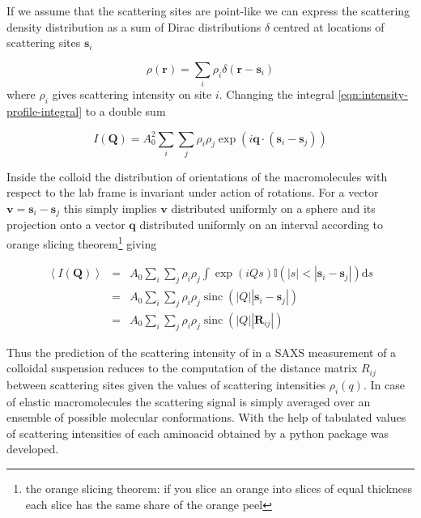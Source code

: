 \documentclass{doctoral}
\newcommand{\dd}{\mathrm{d}}
\newcommand{\code}[1]{\texttt{\detokenize{#1}}}
\begin{document}
If we assume that the scattering sites are point-like we can express the scattering density distribution as a sum of Dirac distributions $\delta$ centred at locations of scattering sites $\mathbf{s}_i$ 

\begin{equation}
    \rho(\mathbf{r}) = \sum_i \rho_i \delta(\mathbf{r}-\mathbf{s}_i)
\end{equation}
where $\rho_i$ gives scattering intensity on site $i$.
Changing the integral \eqref{eqn:intensity-profile-integral} to a double sum 

\begin{equation}
    I(\mathbf{Q}) = A_0^2 \sum_i \sum_j \rho_i \rho_j \exp(i \mathbf{q} \cdot (\mathbf{s}_i - \mathbf{s}_j))
\end{equation}

Inside the colloid the distribution of orientations of the macromolecules with respect to the lab frame is invariant under action of rotations.
For a vector $\mathbf{v} = \mathbf{s}_i - \mathbf{s}_j$ this simply implies $\mathbf{v}$ distributed uniformly on a sphere and its projection onto a vector $\mathbf{q}$ distributed uniformly on an interval according to orange slicing theorem\footnote{the orange slicing theorem: if you slice an orange into slices of equal thickness each slice has the same share of the orange peel} giving 

\begin{eqnarray}
    \left< I(\mathbf{Q}) \right> & = & A_0 \sum_i \sum_j \rho_i \rho_j \int \exp(i Q s) \mathbb{I}(|s| < |\mathbf{s}_i - \mathbf{s}_j|) \dd s \\
                                 & = & A_0 \sum_i \sum_j \rho_i \rho_j \operatorname{sinc}(|Q||\mathbf{s}_i - \mathbf{s}_j|)                  \\
                                 & = & A_0 \sum_i \sum_j \rho_i \rho_j \operatorname{sinc}(|Q||\mathbf{R}_{ij}|)
\end{eqnarray}

Thus the prediction of the scattering intensity of in a SAXS measurement of a colloidal suspension reduces to the computation of the distance matrix $R_{ij}$ between scattering sites given the values of scattering intensities $\rho_i(q)$.
In case of elastic macromolecules the scattering signal is simply averaged over an ensemble of possible molecular conformations.
With the help of tabulated values of scattering intensities of each aminoacid obtained by \textcite{Tong_2016} a python package \code{saxs_single_bead} was developed.
\end{document}
